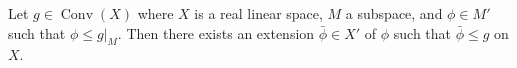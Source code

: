 Let $g\in\operatorname{Conv}(X)$ where $X$ is a real linear space, $M$ a subspace, and $\phi\in M'$ such that $\phi\leqslant g|_M$. Then there exists an extension $\bar{\phi}\in X'$ of $\phi$ such that $\bar{\phi}\leqslant g$ on $X$.
